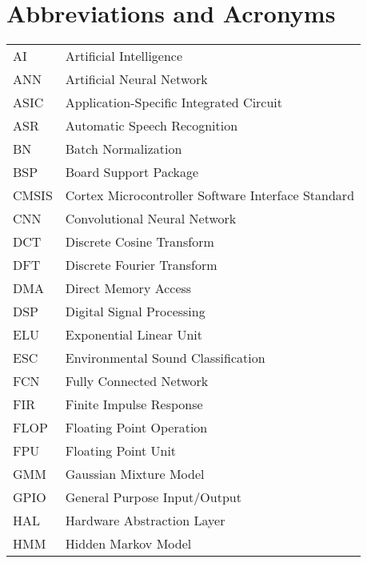 \chapter*{Abbreviations and Acronyms}


\noindent
\begin{longtable}{@{}p{}p{}@{}}
AI              &       Artificial Intelligence \\
ANN             &       Artificial Neural Network  \\
ASIC            &       Application-Specific Integrated Circuit      \\
ASR             &       Automatic Speech Recognition  \\
BN              &       Batch Normalization     \\
BSP             &       Board Support Package     \\
CMSIS           &       Cortex Microcontroller Software Interface Standard    \\
CNN             &       Convolutional Neural Network  \\
DCT             &       Discrete Cosine Transform  \\
DFT             &       Discrete Fourier Transform  \\
DMA             &       Direct Memory Access  \\
DSP             &       Digital Signal Processing  \\
ELU             &       Exponential Linear Unit  \\
ESC             &       Environmental Sound Classification  \\
FCN             &       Fully Connected Network  \\
FIR             &       Finite Impulse Response     \\
FLOP            &       Floating Point Operation   \\
FPU             &       Floating Point Unit  \\
GMM             &       Gaussian Mixture Model  \\
GPIO            &       General Purpose Input/Output    \\
HAL             &       Hardware Abstraction Layer     \\
HMM             &       Hidden Markov Model  \\

\end{longtable}
